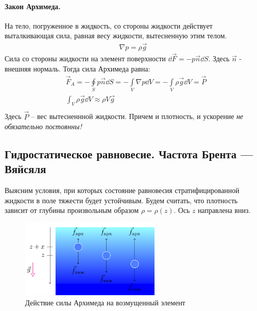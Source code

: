 \paragraph{Закон Архимеда.} На тело, погруженное в жидкость,  со стороны жидкости действует выталкивающая сила, равная весу жидкости, вытесненную этим телом.
\begin{align*}
\nabla p = \rho \vec { g }
\end{align*}
Сила со стороны жидкости на элемент поверхности $ \dd \vec { F } = - p \vec { n }\dd{S} $. Здесь $\vec{n}$ - внешняя нормаль. Тогда сила Архимеда равна:
\begin{align*}
& \vec { F }_ { A }  = - \oint \limits_ { S } p \vec{n}\dd{S} = - \int \limits_ { V } \nabla p\dd{V} = - \int \limits_ { V } \rho \vec { g }\dd{V}=\vec{P}\\
& \int _ { V } \rho \vec { g }\dd{V}  \approx \rho V \vec { g } \\
\end{align*}
Здесь $\vec{P}$ -- вес вытесненнной жидкости. Причем и плотность, и ускорение \textit{не обязательно постоянны!}


\subsection{Гидростатическое равновесие. Частота Брента — Вяйсяля}
Выясним условия, при  которых состояние равновесия стратифицированной жидкости в поле тяжести будет устойчивым. Будем считать, что плотность зависит от глубины произвольным образом $\rho=\rho(z)$. Ось $z$ направлена вниз. 

\begin{figure}[H]
	\centering
	\includegraphics[width=0.6\textwidth]{img/bvfreq.pdf}
	\caption{Действие силы Архимеда на возмущенный элемент}
	\label{fig:arch}
\end{figure}

